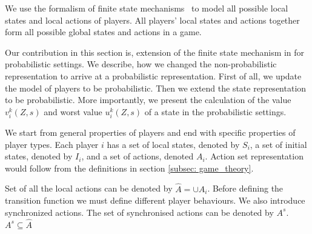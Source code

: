 
We use the formalism of finite state mechanisms~\cite{MMS08} to model all possible local states and local actions of players. All players' local states and actions together form all possible global states and actions in a game. 

Our contribution in this section is, extension of the finite state mechanism in \cite{MMS08} for probabilistic settings. We describe, how we changed the non-probabilistic representation to arrive at a probabilistic representation. First of all, we update the model of players to be probabilistic. Then we extend the state representation to be probabilistic. More importantly, we present the calculation of the value $v_i^{k}(Z, s)$ and worst value $u_i^{k}(Z, s)$ of a state in the probabilistic settings.

We start from general properties of players and end with specific properties of player types. 
Each player $i$ has a set of local states, denoted by $S_i$, a set of initial states, denoted by $I_i$, and a set of actions, denoted $A_i$.  Action set representation would follow from the definitions in section \ref{subsec: game_theory}.

Set of all the local actions can be denoted by $\hat{A} = \cup A_i$. Before defining the transition function we must define different player behaviours. We also introduce synchronized actions. The set of synchronised actions can be denoted by $A^s$. $A^s \subseteq \hat{A}$ 



